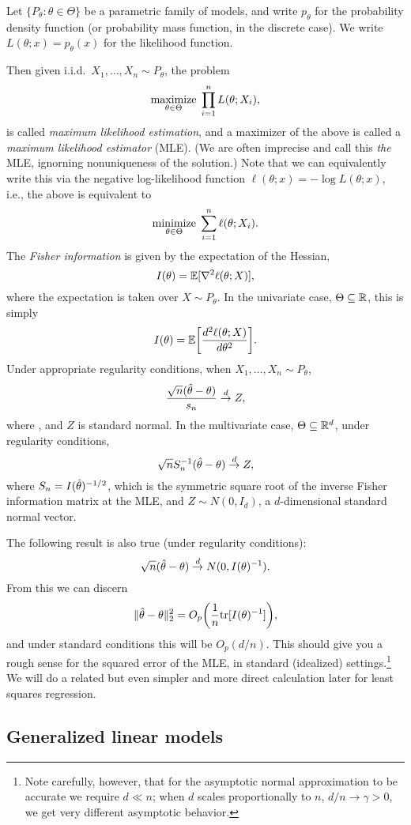 \documentclass{article}
\begin{document}
Let $\{P_\theta : \theta \in \Theta\}$ be a parametric family of models, and 
write $p_\theta$ for the probability density function (or probability mass
function, in the discrete case). We write $L(\theta; x) = p_\theta(x)$ for the
likelihood function.

Then given i.i.d.\ $X_1,\dots, X_n \sim P_\theta$, the problem
\[ 
\mathop{\mathrm{maximize}}_{\theta \in \Theta} \; \prod_{i=1}^n L(\theta; X_i),
\] 
is called \emph{maximum likelihood estimation}, and a maximizer
\smash{$\htheta$} of the above is called a \emph{maximum likelihood estimator}
(MLE). (We are often imprecise and call this \emph{the} MLE, ignorning
nonuniqueness of the solution.) Note that we can equivalently write this via the 
negative log-likelihood function $\ell(\theta; x) = - \log L(\theta; x)$, i.e., 
the above is equivalent
to  
\[
\mathop{\mathrm{minimize}}_{\theta \in \Theta} \; \sum_{i=1}^n \ell(\theta; X_i).
\]
The \emph{Fisher information} is given by the expectation of the Hessian,
\[
I(\theta) = \mathbb{E}[\nabla^2 \ell(\theta; X) ],
\]
where the expectation is taken over $X \sim P_\theta$. In the univariate case, 
$\Theta \subseteq \mathbb{R}$, this is simply 
\[
I(\theta) = \mathbb{E}\bigg[ \frac{d^2 \ell(\theta; X)}{d\theta^2} \bigg].
\]
Under appropriate regularity conditions, when $X_1,\dots,X_n \sim P_\theta$, 
\[
\frac{\sqrt{n}(\hat{\theta} - \theta)}{s_n} \overset{d}{\to} Z, 
\]
where , and $Z$ is standard normal. In the 
multivariate case, $\Theta \subseteq \mathbb{R}^d$, under regularity conditions, 
\[
\sqrt{n} S_n^{-1} (\hat{\theta} - \theta) \overset{d}{\to} Z,
\]
where $S_n = I(\hat{\theta})^{-1/2}$, which is the symmetric square root of the
inverse Fisher information matrix at the MLE, and $Z \sim N(0, I_d)$, a
$d$-dimensional standard normal vector.    

The following result is also true (under regularity conditions):
\[
\sqrt{n} (\hat{\theta} - \theta) \overset{d}{\to} N(0, I(\theta) ^{-1}).
\]
From this we can discern
\[
\|\hat{\theta} - \theta\|_2^2 = O_p \bigg( \frac{1}{n} \mathrm{tr}[I(\theta) ^{-1}] \bigg),   
\] 
and under standard conditions this will be $O_p(d/n)$. This should give you a
rough sense for the squared error of the MLE, in standard (idealized)
settings.\footnote{ Note carefully, however, that for the asymptotic normal
  approximation to be accurate we require $d \ll n$; when $d$ scales
  proportionally to $n$, $d/n \to \gamma > 0$, we get very different asymptotic
  behavior.} 
We will do a related but even simpler and more direct calculation later for
least squares regression. 

\subsection{Generalized linear models}
\end{document}
